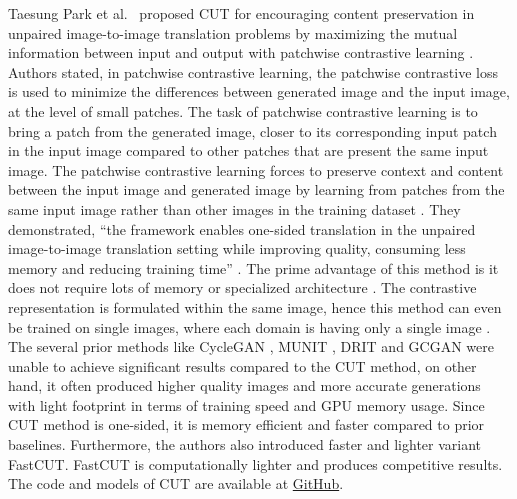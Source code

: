 Taesung Park et al.\ \cite{park2020contrastive} proposed \ac{CUT} for encouraging content preservation in unpaired image-to-image translation problems by maximizing the mutual information between input and output with patchwise contrastive learning \cite{oord2019representation}. Authors stated, in patchwise contrastive learning, the patchwise contrastive loss is used to minimize the differences between generated image and the input image, at the level of small patches. The task of patchwise contrastive learning is to bring a patch from the generated image, closer to its corresponding input patch in the input image compared to other patches that are present the same input image. The patchwise contrastive learning forces to preserve context and content between the input image and generated image by learning from patches from the same input image rather than other images in the training dataset \cite{park2020contrastive}. They demonstrated, ``the framework enables one-sided translation in the unpaired image-to-image translation setting while improving quality, consuming less memory and reducing training time'' \cite{park2020contrastive}. The prime advantage of this method is it does not require lots of memory \cite{8578491} \cite{he2020momentum} or specialized architecture \cite{henaff2020dataefficient} \cite{bachman2019learning}. The contrastive representation is formulated within the same image, hence this method can even be trained on single images, where each domain is having only a single image \cite{park2020contrastive}. The several prior methods like \ac{CycleGAN} \cite{zhu2020unpaired}, \ac{MUNIT} \cite{liu2018unsupervised}, \ac{DRIT} \cite{lee2019drit} and \ac{GCGAN} \cite{fu2018geometryconsistent} were unable to achieve significant results compared to the \ac{CUT} method, on other hand, it often produced higher quality images and more accurate generations with light footprint in terms of training speed and GPU memory usage. Since \ac{CUT} method is one-sided, it is memory efficient and faster compared to prior baselines. Furthermore, the authors also introduced faster and lighter variant \ac{FastCUT}. \ac{FastCUT} is computationally lighter and produces competitive results. The code and models of \ac{CUT} are available at \href{https://github.com/taesungp/contrastive-unpaired-translation}{GitHub}.


